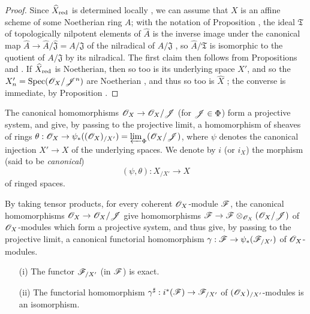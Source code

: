 \begin{proof}
\label{proof-1.10.8.6}
Since $\widehat{X}_{\mathrm{red}}$ is determined locally , we can assume that $X$ is an affine scheme of some Noetherian ring $A$; with the notation of Proposition , the ideal $\mathfrak{T}$ of topologically nilpotent elements of $\widehat{A}$ is the inverse image under the canonical map $\widehat{A}\to\widehat{A}/\widehat{\mathfrak{J}}=A/\mathfrak{J}$ of the nilradical of $A/\mathfrak{J}$ , so $\widehat{A}/\mathfrak{T}$ is isomorphic to the quotient of $A/\mathfrak{J}$ by its nilradical.
The first claim then follows from Propositions  and .
If $\widehat{X}_{\mathrm{red}}$ is Noetherian, then so too is its underlying space $X'$, and so the $X_n'=\operatorname{Spec}(\mathscr{O}_X/\mathscr{J}^n)$ are Noetherian , and thus so too is $\widehat{X}$ ; the converse is immediate, by Proposition .
\end{proof}

\begin{env}[10.8.7]
\label{1.10.8.7}
The canonical homomorphisms $\sh{O}_X\to\sh{O}_X/\sh{J}$ (for $\mathscr{J}\in\Phi$) form a projective system, and give, by passing to the projective limit, a homomorphism of sheaves of rings $\theta:\sh{O}_X\to\psi_*((\sh{O}_X)_{/X'})=\varprojlim_\Phi(\sh{O}_X/\sh{J})$, where $\psi$ denotes the canonical injection $X'\to X$ of the underlying spaces.
We denote by $i$ (or $i_X$) the morphism (said to be \emph{canonical})
\[
  (\psi,\theta):X_{/X'}\to X
\]
of ringed spaces.

By taking tensor products, for every coherent $\mathscr{O}_X$-module $\mathscr{F}$, the canonical homomorphisms $\sh{O}_X\to\sh{O}_X/\sh{J}$ give homomorphisms $\sh{F}\to\sh{F}\otimes_{\sh{O}_X}(\sh{O}_X/\sh{J})$ of $\mathscr{O}_X$-modules which form a projective system, and thus give, by passing to the projective limit, a canonical functorial homomorphism $\gamma:\sh{F}\to\psi_*(\sh{F}_{/X'})$ of $\mathscr{O}_X$-modules.
\end{env}

\begin{proposition}[10.8.8]
\label{1.10.8.8}
\medskip\noindent
\begin{enumerate}
  \item[\rm{(i)}] The functor $\mathscr{F}_{/X'}$ (in $\mathscr{F}$) is exact.
  \item[\rm{(ii)}] The functorial homomorphism $\gamma^\sharp:i^*(\sh{F})\to\sh{F}_{/X'}$ of $(\mathscr{O}_X)_{/X'}$-modules is an isomorphism.
\end{enumerate}
\end{proposition}

